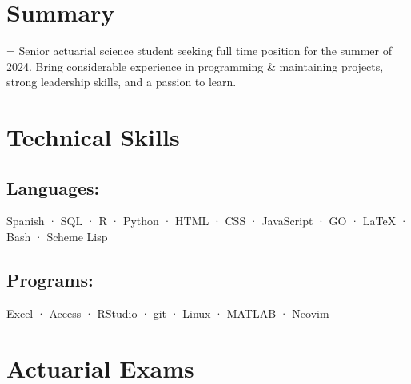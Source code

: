\documentclass[12pt]{article}
\newcommand{\itemspace}{\vspace{0.1870em}}
\renewcommand{\textsc}[1]{\uppercase{\footnotesize#1}\normalsize}
\begin{document}
\maketitle

\vspace{-2.8mm}
\noindent\hrulefill

\vspace{-4.5mm}
\noindent\hrulefill

\itemspace
\section{Summary}

\hangindent=\parindent %
Senior actuarial science student seeking full time position for the summer of
2024. Bring considerable experience in programming \& maintaining projects,
strong leadership skills, and a passion to learn.

\itemspace

\section{Technical Skills}

\subsection{Languages:} \:
Spanish · \textsc{sql} · \textsc{r} · Python · \textsc{html} · \textsc{css} ·
JavaScript · \textsc{go} · \LaTeX{} · Bash · Scheme Lisp

\subsection{Programs:} \:
Excel · Access · RStudio · git ·  Linux · \textsc{MATLAB} · Neovim

\itemspace

\section{Actuarial Exams}
\end{document}

